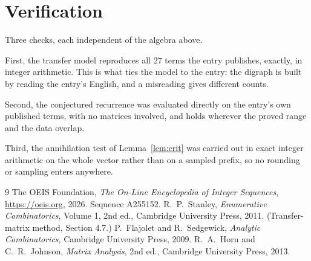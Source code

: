 \documentclass[11pt,a4paper]{article}
\theoremstyle{plain}
\theoremstyle{definition}
\begin{document}
\section{Verification}

Three checks, each independent of the algebra above.

First, the transfer model reproduces all $27$ terms the entry publishes, exactly, in
integer arithmetic. This is what ties the model to the entry: the digraph is built by reading
the entry's English, and a misreading gives different counts.

Second, the conjectured recurrence was evaluated directly on the entry's own published terms,
with no matrices involved, and holds wherever the proved range and the data overlap.

Third, the annihilation test of Lemma~\ref{lem:crit} was carried out in exact integer
arithmetic on the whole vector rather than on a sampled prefix, so no rounding or sampling
enters anywhere.

\begin{thebibliography}{9}
 The OEIS Foundation, \emph{The On-Line Encyclopedia of Integer
Sequences}, \url{https://oeis.org}, 2026. Sequence A255152.
 R.~P.~Stanley, \emph{Enumerative Combinatorics}, Volume 1, 2nd ed.,
Cambridge University Press, 2011. (Transfer-matrix method, Section 4.7.)
 P.~Flajolet and R.~Sedgewick, \emph{Analytic Combinatorics}, Cambridge
University Press, 2009.
 R.~A.~Horn and C.~R.~Johnson, \emph{Matrix Analysis}, 2nd ed., Cambridge
University Press, 2013.
\end{thebibliography}
\end{document}
